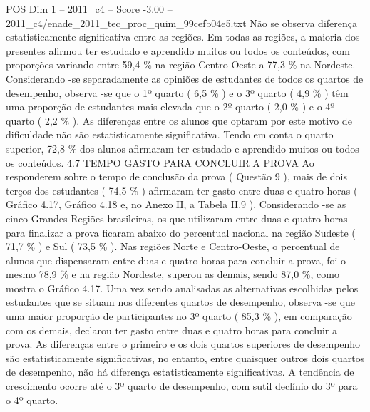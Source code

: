 \begin{textsample}{POS Dim 1 – 2011\_c4 – Score -3.00 – 2011\_c4/enade\_2011\_tec\_proc\_quim\_99cefb04e5.txt}
Não se observa diferença estatisticamente significativa entre as regiões.
Em todas as regiões, a maioria dos presentes afirmou ter estudado e aprendido muitos ou todos os conteúdos, com proporções variando entre 59,4 \% na região Centro-Oeste a 77,3 \% na Nordeste.
Considerando -se separadamente as opiniões de estudantes de todos os quartos de desempenho, observa -se que o 1º quarto ( 6,5 \% ) e o 3º quarto ( 4,9 \% ) têm uma proporção de estudantes mais elevada que o 2º quarto ( 2,0 \% ) e o 4º quarto ( 2,2 \% ).
As diferenças entre os alunos que optaram por este motivo de dificuldade não são estatisticamente significativa.
Tendo em conta o quarto superior, 72,8 \% dos alunos afirmaram ter estudado e aprendido muitos ou todos os conteúdos. 4.7 TEMPO GASTO PARA CONCLUIR A PROVA Ao responderem sobre o tempo de conclusão da prova ( Questão 9 ), mais de dois terços dos estudantes ( 74,5 \% ) afirmaram ter gasto entre duas e quatro horas ( Gráfico 4.17, Gráfico 4.18 e, no Anexo II, a Tabela II.9 ).
Considerando -se as cinco Grandes Regiões brasileiras, os que utilizaram entre duas e quatro horas para finalizar a prova ficaram abaixo do percentual nacional na região Sudeste ( 71,7 \% ) e Sul ( 73,5 \% ).
Nas regiões Norte e Centro-Oeste, o percentual de alunos que dispensaram entre duas e quatro horas para concluir a prova, foi o mesmo 78,9 \% e na região Nordeste, superou as demais, sendo 87,0 \%, como mostra o Gráfico 4.17.
Uma vez sendo analisadas as alternativas escolhidas pelos estudantes que se situam nos diferentes quartos de desempenho, observa -se que uma maior proporção de participantes no 3º quarto ( 85,3 \% ), em comparação com os demais, declarou ter gasto entre duas e quatro horas para concluir a prova.
As diferenças entre o primeiro e os dois quartos superiores de desempenho são estatisticamente significativas, no entanto, entre quaisquer outros dois quartos de desempenho, não há diferença estatisticamente significativas.
A tendência de crescimento ocorre até o 3º quarto de desempenho, com sutil declínio do 3º para o 4º quarto.

\end{textsample}
